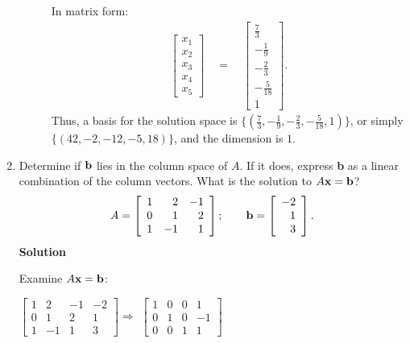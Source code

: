 \begin{enumerate}
\begin{description}
\noindent In matrix form:
\begin{eqnarray*}
\left [ \begin{array}{r}
                x_{1}\\
                x_{2}\\
                x_{3}\\
                x_{4}\\
                x_{5} \end{array} \right] \quad = \quad
\left [ \begin{array}{r}
                \frac{7}{3}\\
                -\frac{1}{9}\\
                -\frac{2}{3}\\
                -\frac{5}{18}\\
                1\end{array} \right].
\end{eqnarray*}
\noindent Thus, a basis for the solution space is
$\{(\frac{7}{3},-\frac{1}{9},-\frac{2}{3},-\frac{5}{18},1)\}$, or
simply $\{(42,-2,-12,-5,18)\}$, and the dimension is $1$.
\end{description}

\item Determine if ${\bf b}$ lies in the column space of $A$. If
it does, express {\bf b} as a linear combination of the column
vectors. What is the solution to $A{\bf x}={\bf b}$? $$A=\left [
\begin{array}{rrr} 1&2&-1\\ 0&1&2\\ 1&-1&1
\end{array} \right ]; \quad \quad {\bf b}=\left [ \begin{array}{r}
-2\\1\\3\end{array} \right ].$$
\noindent \textbf{Solution}

\noindent Examine $A{\bf x}={\bf b}$:

$\left [ \begin{array}{rrr|r}
                       1&2&-1&-2\\
                       0&1&2&1\\
                       1&-1&1&3\end{array} \right] \Rightarrow $
$\left [ \begin{array}{rrr|r}
                       1&0&0&1\\
                       0&1&0&-1\\
                       0&0&1&1\end{array} \right]$


\end{enumerate}
